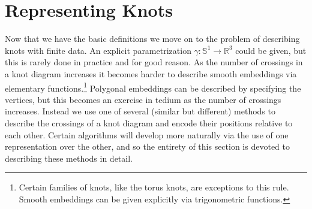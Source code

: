 \section{Representing Knots}
    Now that we have the basic definitions we move on to the problem of
    describing knots with finite data. An explicit parametrization
    $\gamma:\mathbb{S}^{1}\rightarrow\mathbb{R}^{3}$ could be given, but this
    is rarely done in practice and for good reason. As the number of crossings
    in a knot diagram increases it becomes harder to describe smooth embeddings
    via elementary functions.\footnote{%
        Certain families of knots, like the torus knots, are
        exceptions to this rule. Smooth embeddings can be given explicitly via
        trigonometric functions.
    }
    Polygonal embeddings can be described by specifying the vertices, but this
    becomes an exercise in tedium as the number of crossings increases.
    Instead we use one of several (similar but different) methods to describe
    the crossings of a knot diagram and encode their positions relative to
    each other. Certain algorithms will develop more naturally via the use
    of one representation over the other, and so the entirety of this section
    is devoted to describing these methods in detail.
